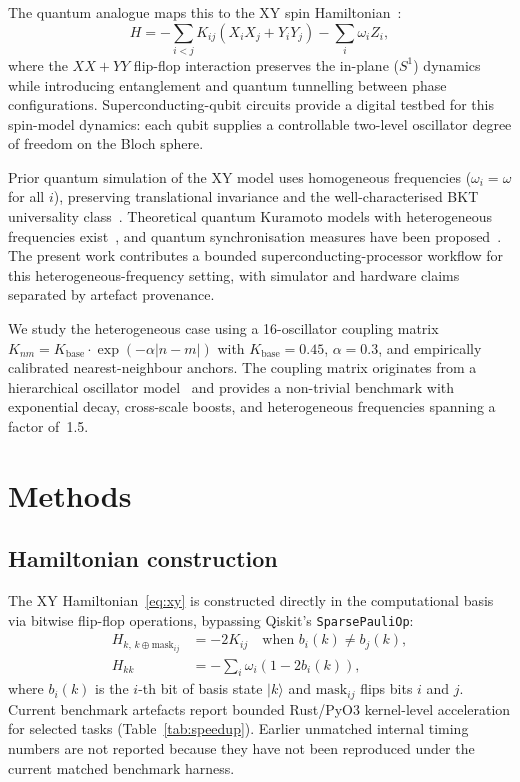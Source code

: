 \documentclass[twocolumn,prl,superscriptaddress,showpacs,floatfix]{revtex4-2}
\begin{document}
The quantum analogue maps this to the XY spin
Hamiltonian~\cite{Pikovsky2001}:
%
\begin{equation}\label{eq:xy}
  H = -\sum_{i<j} K_{ij}(X_i X_j + Y_i Y_j) - \sum_i \omega_i Z_i,
\end{equation}
%
where the $XX + YY$ flip-flop interaction preserves the in-plane ($S^1$)
dynamics while introducing entanglement and quantum tunnelling between
phase configurations. Superconducting-qubit circuits provide a digital
testbed for this spin-model dynamics: each qubit supplies a controllable
two-level oscillator degree of freedom on the Bloch sphere.

Prior quantum simulation of the XY model uses homogeneous frequencies
($\omega_i = \omega$ for all $i$), preserving translational invariance
and the well-characterised BKT universality
class~\cite{Berezinskii1972,Kosterlitz1973}. Theoretical quantum
Kuramoto models with heterogeneous frequencies
exist~\cite{Pikovsky2001,Acebron2005}, and quantum synchronisation
measures have been proposed~\cite{Ameri2015,Galve2013,Ma2020,Giorgi2013}.
The present work contributes a bounded superconducting-processor workflow
for this heterogeneous-frequency setting, with simulator and hardware
claims separated by artefact provenance.

We study the heterogeneous case using a 16-oscillator coupling matrix
$K_{nm} = K_{\mathrm{base}} \cdot \exp(-\alpha|n-m|)$ with
$K_{\mathrm{base}} = 0.45$, $\alpha = 0.3$, and empirically calibrated
nearest-neighbour anchors. The coupling matrix originates from a
hierarchical oscillator model~\cite{Sotek2025} and provides a
non-trivial benchmark with exponential decay, cross-scale boosts, and
heterogeneous frequencies spanning a factor of~1.5.

\section{Methods}

\subsection{Hamiltonian construction}

The XY Hamiltonian~\eqref{eq:xy} is constructed directly in the
computational basis via bitwise flip-flop operations, bypassing
Qiskit's \texttt{SparsePauliOp}:
%
\begin{align}
  H_{k,\, k \oplus \mathrm{mask}_{ij}} &= -2K_{ij}
    \quad\text{when } b_i(k) \neq b_j(k), \\
  H_{kk} &= -\sum_i \omega_i (1 - 2b_i(k)),
\end{align}
%
where $b_i(k)$ is the $i$-th bit of basis state $|k\rangle$ and
$\mathrm{mask}_{ij}$ flips bits $i$ and $j$. Current benchmark artefacts
report bounded Rust/PyO3 kernel-level acceleration for selected tasks
(Table~\ref{tab:speedup}). Earlier unmatched internal timing numbers are
not reported because they have not been reproduced under the current
matched benchmark harness.
\end{document}
